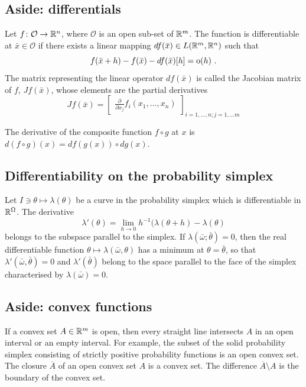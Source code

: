 \documentclass[12pt,a4paper]{amsart}
\theoremstyle{plain}%
\theoremstyle{definition}
\theoremstyle{remark}
\begin{document}
\subsection{Aside: differentials}
Let $f \colon \mathcal O \to \mathbb{R}^n$, where $\mathcal O$ is an open sub-set of $\mathbb{R}^m$. The function is differentiable at $\bar x \in \mathcal O$ if there exists a linear mapping $df(\bar x) \in L(\mathbb{R}^m,\mathbb{R}^n)$ such that
\begin{equation*}
f(\bar x + h) - f(\bar x) - df(\bar x)[h] = \operatorname{o}(h) \ .
\end{equation*}
The matrix representing the linear operator $df(\bar x)$ is called the Jacobian matrix of $f$, $Jf(\bar x)$, whose elements are the partial derivatives
\begin{equation*}
  Jf(\bar x) =
  \begin{bmatrix}
    \frac{\partial}{\partial x_j} f_i(x_1,\dots,x_n)
  \end{bmatrix}_{i=1,\dots,n; j=1,\dots m}
\end{equation*}

The derivative of the composite function $f \circ g$ at $x$ is $d(f\circ g)(x) = df(g(x)) \circ dg(x)$.

\subsection{Differentiability on the probability simplex} Let $I \ni \theta \mapsto \lambda(\theta)$ be a curve in the probability simplex  which is differentiable in $\mathbb{R}^\Omega$. The derivative
\begin{equation*}
\lambda'(\theta) = \lim_{h \to 0} h^{-1} (\lambda(\theta+h) - \lambda(\theta)
\end{equation*}
belongs to the subspace parallel to the simplex. If $\lambda(\bar \omega;\bar \theta) = 0$, then the real differentiable function $\theta \mapsto \lambda(\bar\omega,\theta)$ has a minimum at $\theta=\bar\theta$, so that $\lambda'(\bar\omega,\bar\theta)=0$ and $\lambda'(\bar\theta)$ belong to the space parallel to the face of the simplex characterised by $\lambda(\bar\omega) = 0$.

\subsection{Aside: convex functions}

If a convex set $A \in \mathbb{R}^m$ is open, then every straight line
intersects $A$ in an open interval or an empty interval. For example,
the subset of the solid probability simplex consisting of strictly
positive probability functions is an open convex set. The closure
$\overline A$ of an open convex set $A$ is a convex set. The
difference $\overline A \setminus A$ is the boundary of the convex
set.
\end{document}
